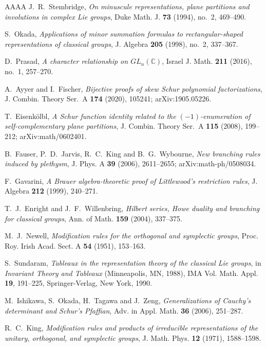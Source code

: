 \documentclass[11pt,reqno]{amsart}
\theoremstyle{plain}
\theoremstyle{definition}
\newcommand{\CC}{\mathbb{C}}
\begin{document}
\begin{thebibliography}{AAAA}
 J.~R.~Stembridge, \emph{On minuscule representations, plane partitions and
involutions in complex Lie groups}, Duke Math. J. \textbf{73} (1994), no.~2, 469--490.

 S.~Okada, \emph{Applications of minor summation formulas to
rectangular-shaped representations of classical groups}, J. Algebra \textbf{205} (1998), no.~2,
337--367.

 D.~Prasad, \emph{A character relationship on $GL_n(\CC)$}, Israel J. Math.
\textbf{211} (2016), no.~1, 257--270.

 A.~Ayyer and I.~Fischer, \emph{Bijective proofs of skew Schur polynomial
factorizations}, J. Combin. Theory Ser.~A \textbf{174} (2020), 105241; arXiv:1905.05226.

 T.~Eisenk\"olbl, \emph{A Schur function identity related to the
$(-1)$-enumeration of self-complementary plane partitions}, J. Combin. Theory Ser.~A \textbf{115}
(2008), 199--212; arXiv:math/0602401.

 B.~Fauser, P.~D.~Jarvis, R.~C.~King and B.~G.~Wybourne, \emph{New branching
rules induced by plethysm}, J. Phys. A \textbf{39} (2006), 2611--2655; arXiv:math-ph/0508034.

 F.~Gavarini, \emph{A Brauer algebra-theoretic proof of Littlewood's
restriction rules}, J. Algebra \textbf{212} (1999), 240--271.

 T.~J.~Enright and J.~F.~Willenbring, \emph{Hilbert series, Howe duality and
branching for classical groups}, Ann. of Math. \textbf{159} (2004), 337--375.

 M.~J.~Newell, \emph{Modification rules for the orthogonal and symplectic
groups}, Proc. Roy. Irish Acad. Sect. A \textbf{54} (1951), 153--163.

 S.~Sundaram, \emph{Tableaux in the representation theory of the classical Lie
groups}, in \emph{Invariant Theory and Tableaux} (Minneapolis, MN, 1988), IMA Vol. Math. Appl.
\textbf{19}, 191--225, Springer-Verlag, New York, 1990.

 M.~Ishikawa, S.~Okada, H.~Tagawa and J.~Zeng, \emph{Generalizations of
Cauchy's determinant and Schur's Pfaffian}, Adv. in Appl. Math. \textbf{36} (2006), 251--287.

 R.~C.~King, \emph{Modification rules and products of irreducible
representations of the unitary, orthogonal, and symplectic groups}, J. Math. Phys. \textbf{12}
(1971), 1588--1598.


\end{thebibliography}
\end{document}
